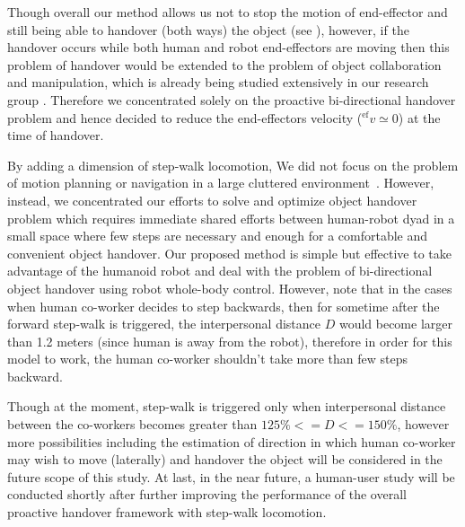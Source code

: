 Though overall our method allows us not to stop the motion of end-effector and still being able to handover (both ways) the object (see ), however, if the handover occurs while both human and robot end-effectors are moving then this problem of handover would be extended to the problem of object collaboration and manipulation, which is already being studied extensively in our research group \cite{bussy2012proactive, agravante2016walking, agravante2013human, bussy2012human, agravante2014collaborative, Agravante2019}. Therefore we concentrated solely on the proactive bi-directional handover problem and hence decided to reduce the end-effectors velocity (${}^\text{ef}v\simeq0$) at the time of handover. 

By adding a dimension of step-walk locomotion, We did not focus on the problem of motion planning or navigation in a large cluttered environment~\cite{mainprice2012sharing, vahrenkamp2009humanoid, kim2004advanced}. However, instead, we concentrated our efforts to solve and optimize object handover problem which requires immediate shared efforts between human-robot dyad in a small space where few steps are necessary and enough for a comfortable and convenient object handover. Our proposed method is simple but effective to take advantage of the humanoid robot and deal with the problem of bi-directional object handover using robot whole-body control. However, note that in the cases when human co-worker decides to step backwards, then for sometime after the forward step-walk is triggered, the interpersonal distance $ D $ would become larger than 1.2 meters (since human is away from the robot), therefore in order for this model to work, the human co-worker shouldn't take more than few steps backward.

Though at the moment, step-walk is triggered only when interpersonal distance between the co-workers becomes greater than $ 125\% <= D <= 150\% $, however more possibilities including the estimation of direction in which human co-worker may wish to move (laterally) and handover the object will be considered in the future scope of this study. At last, in the near future, a human-user study will be conducted shortly after further improving the performance of the overall proactive handover framework with step-walk locomotion.


\clearpage %
\pagestyle{fancy}









